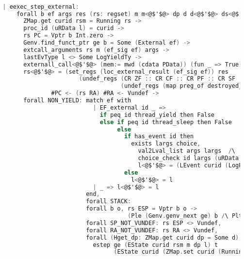 \begin{lstlisting}[language=C]

  | eexec_step_external:
      forall b ef args res (rs: regset) m m<@$'$@> dp d d<@$'$@> ds<@$'$@> t rs<@$'$@> curid rsm l l<@$'$@>,
        ZMap.get curid rsm = Running rs ->
        proc_id (uRData l) = curid ->
        rs PC = Vptr b Int.zero ->
        Genv.find_funct_ptr ge b = Some (External ef) ->
        extcall_arguments rs m (ef_sig ef) args ->
        lastEvType l <> Some LogYieldTy ->
        externall_call<@$'$@> (mem:= mwd (cdata PData)) (fun _ => True) ef ge args (m, (uRData l, d)) t res (m<@$'$@>, (ds<@$'$@>,d<@$'$@>)) ->
        rs<@$'$@> = (set_regs (loc_external_result (ef_sig ef)) res 
                        (undef_regs (CR ZF :: CR CF :: CR PF :: CR SF :: CR OF :: nil)
                                    (undef_regs (map preg_of destroyed_at_call) rs))) 
                #PC <- (rs RA) #RA <- Vundef ->
        forall NON_YIELD: match ef with
                            | EF_external id _ => 
                              if peq id thread_yield then False
                              else if peq id thread_sleep then False
                                   else
                                     if has_event id then
                                       exists largs choice,
                                         val2Lval_list args largs  /\
                                         choice_check id largs (uRData l) d = choice /\ 
                                         l<@$'$@> = (LEvent curid (LogPrim id largs choice (snap_func d)) :: l) 
                                     else
                                       l<@$'$@> = l
                            | _ => l<@$'$@> = l
                          end,
                          forall STACK:
                          forall b o, rs ESP = Vptr b o ->
                                      (Ple (Genv.genv_next ge) b /\ Plt b (Mem.nextblock m)),
                          forall SP_NOT_VUNDEF: rs ESP <> Vundef,
                          forall RA_NOT_VUNDEF: rs RA <> Vundef,
                          forall (Hget_dp: ZMap.get curid dp = Some d),
                            estep ge (EState curid rsm m dp l) t 
                                  (EState curid (ZMap.set curid (Running rs<@$'$@>) rsm) m<@$'$@> (ZMap.set curid (Some d<@$'$@>) dp) l<@$'$@>)
\end{lstlisting}


